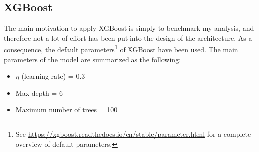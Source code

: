 \subsection*{XGBoost}\label{subsec:XGBoost}
The main motivation to apply XGBoost is simply to benchmark my analysis, and therefore not a lot of effort has been put into the design of the 
architecture. As a consequence, the default parameters\footnote{See \href{https://xgboost.readthedocs.io/en/stable/parameter.html}
{https://xgboost.readthedocs.io/en/stable/parameter.html}
for a complete overview of default parameters.} of XGBoost have been used. The main parameters of the model are summarized as the following:
\begin{itemize}
    \item $\eta$ (learning-rate) = 0.3
    \item Max depth = 6
    \item Maximum number of trees = 100
\end{itemize}


